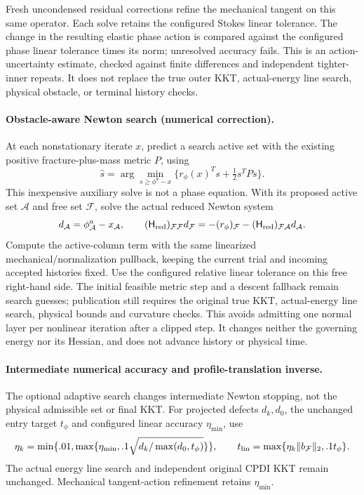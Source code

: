 \documentclass[11pt,a4paper]{article}
\begin{document}
Fresh uncondensed residual corrections refine the mechanical tangent on this
same operator. Each solve retains the configured Stokes linear tolerance.
The change in the resulting elastic phase action is compared against the
configured phase linear tolerance times its norm; unresolved accuracy fails.
This is an action-uncertainty estimate, checked against finite differences and
independent tighter-inner repeats. It does not replace the true outer KKT,
actual-energy line search, physical obstacle, or terminal history checks.


\paragraph{Obstacle-aware Newton search (numerical correction).}
At each nonstationary iterate $x$, predict a search active set with the existing
positive fracture-plus-mass metric $P$, using
\[
 \widehat s=\arg\min_{s\ge\phi^a-x}
       \{r_\phi(x)^Ts+\tfrac12s^TPs\}.
\]
This inexpensive auxiliary solve is not a phase equation. With its proposed
active set $\mathcal A$ and free set $\mathcal F$, solve the actual reduced
Newton system
\[
 d_{\mathcal A}=\phi^a_{\mathcal A}-x_{\mathcal A},\qquad
 (\mathsf H_{\rm red})_{\mathcal F\mathcal F}d_{\mathcal F}
 =-(r_\phi)_{\mathcal F}
  -(\mathsf H_{\rm red})_{\mathcal F\mathcal A}d_{\mathcal A}.
\]
Compute the active-column term with the same linearized mechanical/normalization
pullback, keeping the current trial and incoming accepted histories fixed.
Use the configured relative linear tolerance on this free right-hand side.
The initial feasible metric step and a descent fallback remain search guesses;
publication still requires the original true KKT, actual-energy line search,
physical bounds and curvature checks. This avoids admitting one normal layer
per nonlinear iteration after a clipped step. It changes neither the governing
energy nor its Hessian, and does not advance history or physical time.

\paragraph{Intermediate numerical accuracy and profile-translation inverse.}
The optional adaptive search changes intermediate Newton stopping, not the
physical admissible set or final KKT. For projected defects $d_k,d_0$, the
unchanged entry target $t_\phi$ and configured linear accuracy $\eta_{\min}$,
use
\[
 \eta_k=\min\{.01,\max\{\eta_{\min},.1\sqrt{d_k/\max(d_0,t_\phi)}\}\},
 \qquad t_{\rm lin}=\max\{\eta_k\|b_{\mathcal F}\|_2,.1t_\phi\}.
\]
The actual energy line search and independent original CPDI KKT remain unchanged.
Mechanical tangent-action refinement retains $\eta_{\min}$.
\end{document}
